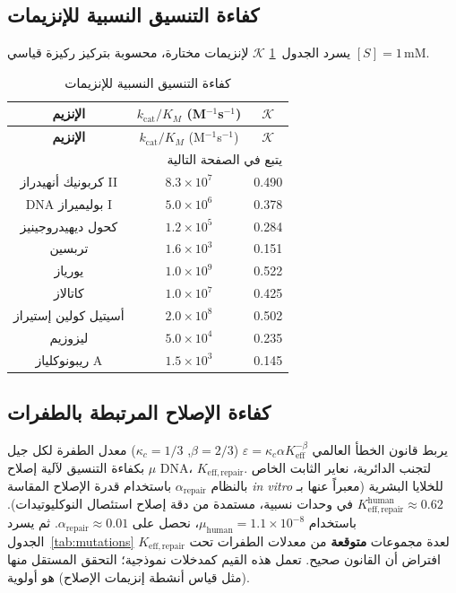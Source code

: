\documentclass[11pt,a4paper]{article}
\newcommand{\REL}{\mathcal{K}}
\begin{document}
	\subsection{كفاءة التنسيق النسبية للإنزيمات}
	\label{sec:enzymes}
	يسرد الجدول~\ref{tab:enzymes} \(\REL\) لإنزيمات مختارة، محسوبة بتركيز ركيزة قياسي \([S]=1\,\text{mM}\).
	
	\begin{longtable}{|c|c|c|}
		\caption{كفاءة التنسيق النسبية للإنزيمات}\label{tab:enzymes}\\
		\hline
		\textbf{الإنزيم} & \(k_{\mathrm{cat}}/K_M\) (M\(^{-1}\)s\(^{-1}\)) & \(\REL\) \\
		\hline
		\endfirsthead
		\hline
		\textbf{الإنزيم} & \(k_{\mathrm{cat}}/K_M\) (M\(^{-1}\)s\(^{-1}\)) & \(\REL\) \\
		\hline
		\endhead
		\hline
		\multicolumn{3}{r}{يتبع في الصفحة التالية}\\
		\endfoot
		\hline
		\endlastfoot
		كربونيك أنهيدراز II & \(8.3\times10^7\) & 0.490 \\
		DNA بوليميراز I & \(5.0\times10^6\) & 0.378 \\
		كحول ديهيدروجينيز & \(1.2\times10^5\) & 0.284 \\
		تربسين & \(1.6\times10^3\) & 0.151 \\
		يورياز & \(1.0\times10^9\) & 0.522 \\
		كاتالاز & \(1.0\times10^7\) & 0.425 \\
		أسيتيل كولين إستيراز & \(2.0\times10^8\) & 0.502 \\
		ليزوزيم & \(5.0\times10^4\) & 0.235 \\
		ريبونوكلياز A & \(1.5\times10^3\) & 0.145 \\
		\hline
	\end{longtable}
	
	\subsection{كفاءة الإصلاح المرتبطة بالطفرات}
	\label{sec:mutations}
	يربط قانون الخطأ العالمي \(\varepsilon = \kappa_c \alpha K_{\mathrm{eff}}^{-\beta}\) (\(\beta=2/3\), \(\kappa_c=1/3\)) معدل الطفرة لكل جيل \(\mu\) بكفاءة التنسيق لآلية إصلاح DNA، \(K_{\mathrm{eff,repair}}\). لتجنب الدائرية، نعاير الثابت الخاص بالنظام \(\alpha_{\mathrm{repair}}\) باستخدام قدرة الإصلاح المقاسة \textit{in vitro} للخلايا البشرية (معبراً عنها بـ \(K_{\mathrm{eff,repair}}^{\mathrm{human}} \approx 0.62\) في وحدات نسبية، مستمدة من دقة إصلاح استئصال النوكليوتيدات). باستخدام \(\mu_{\mathrm{human}}=1.1\times10^{-8}\)، نحصل على \(\alpha_{\mathrm{repair}} \approx 0.01\). ثم يسرد الجدول~\ref{tab:mutations} \(K_{\mathrm{eff,repair}}\) لعدة مجموعات \textbf{متوقعة} من معدلات الطفرات تحت افتراض أن القانون صحيح. تعمل هذه القيم كمدخلات نموذجية؛ التحقق المستقل منها (مثل قياس أنشطة إنزيمات الإصلاح) هو أولوية.
	
\end{document}

